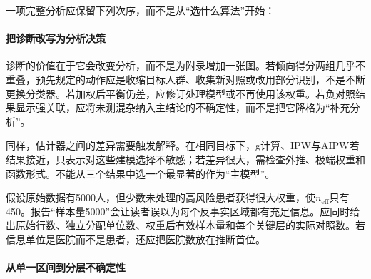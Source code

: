 一项完整分析应保留下列次序，而不是从“选什么算法”开始：

\begin{center}
\end{center}

\paragraph{把诊断改写为分析决策}

诊断的价值在于它会改变分析，而不是为附录增加一张图。若倾向得分两组几乎不重叠，预先规定的动作应是收缩目标人群、收集新对照或改用部分识别，不是不断更换分类器。若加权后平衡仍差，应修订处理模型或不再使用该权重。若负对照结果显示强关联，应将未测混杂纳入主结论的不确定性，而不是把它降格为“补充分析”。

同样，估计器之间的差异需要触发解释。在相同目标下，g计算、IPW与AIPW若结果接近，只表示对这些建模选择不敏感；若差异很大，需检查外推、极端权重和函数形式。不能从三个结果中选一个最显著的作为“主模型”。

\begin{failurecheck}[有效样本量与原始行数混为一谈]
假设原始数据有5000人，但少数未处理的高风险患者获得很大权重，使$n_{\mathrm{eff}}$只有450。报告“样本量5000”会让读者误以为每个反事实区域都有充足信息。应同时给出原始行数、独立分配单位数、权重后有效样本量和每个关键层的实际对照数。若信息单位是医院而不是患者，还应把医院数放在推断首位。
\end{failurecheck}

\paragraph{从单一区间到分层不确定性}

